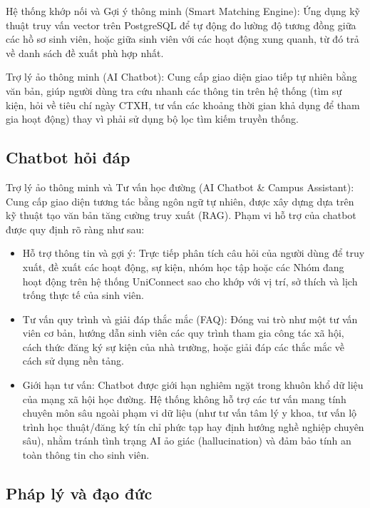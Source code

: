 Hệ thống khớp nối và Gợi ý thông minh (Smart Matching Engine): Ứng dụng kỹ thuật truy vấn vector trên PostgreSQL để tự động đo lường độ tương đồng giữa các hồ sơ sinh viên, hoặc giữa sinh viên với các hoạt động xung quanh, từ đó trả về danh sách đề xuất phù hợp nhất.

Trợ lý ảo thông minh (AI Chatbot): Cung cấp giao diện giao tiếp tự nhiên bằng văn bản, giúp người dùng tra cứu nhanh các thông tin trên hệ thống (tìm sự kiện, hỏi về tiêu chí ngày CTXH, tư vấn các khoảng thời gian khả dụng để tham gia hoạt động) thay vì phải sử dụng bộ lọc tìm kiếm truyền thống.

\subsection{Chatbot hỏi đáp}

Trợ lý ảo thông minh và Tư vấn học đường (AI Chatbot \& Campus Assistant): Cung cấp giao diện tương tác bằng ngôn ngữ tự nhiên, được xây dựng dựa trên kỹ thuật tạo văn bản tăng cường truy xuất (RAG). Phạm vi hỗ trợ của chatbot được quy định rõ ràng như sau:

\begin{itemize}
    \item Hỗ trợ thông tin và gợi ý: Trực tiếp phân tích câu hỏi của người dùng để truy xuất, đề xuất các hoạt động, sự kiện, nhóm học tập hoặc các Nhóm đang hoạt động trên hệ thống UniConnect sao cho khớp với vị trí, sở thích và lịch trống thực tế của sinh viên.
    
    \item Tư vấn quy trình và giải đáp thắc mắc (FAQ): Đóng vai trò như một tư vấn viên cơ bản, hướng dẫn sinh viên các quy trình tham gia công tác xã hội, cách thức đăng ký sự kiện của nhà trường, hoặc giải đáp các thắc mắc về cách sử dụng nền tảng.
    
    \item Giới hạn tư vấn: Chatbot được giới hạn nghiêm ngặt trong khuôn khổ dữ liệu của mạng xã hội học đường. Hệ thống không hỗ trợ các tư vấn mang tính chuyên môn sâu ngoài phạm vi dữ liệu (như tư vấn tâm lý y khoa, tư vấn lộ trình học thuật/đăng ký tín chỉ phức tạp hay định hướng nghề nghiệp chuyên sâu), nhằm tránh tình trạng AI ảo giác (hallucination) và đảm bảo tính an toàn thông tin cho sinh viên\cite{ji2023survey}.
\end{itemize}

\subsection{Pháp lý và đạo đức}

